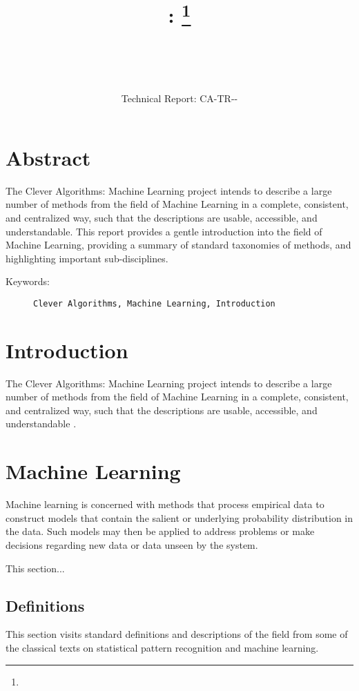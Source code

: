 \documentclass[a4paper, 11pt]{article}
\title{{\myreporttitle}: {\myreportsubtitle}\footnote{\myreportlicense}}
\author{\myreportauthor\\{\myreportemail}\\\small\myreportproject}
\date{\myreportfulldate\\{\small{Technical Report: CA-TR-{\myreportdate}-\myreportversion}}}
\begin{document}
\maketitle

\section*{Abstract} 
The Clever Algorithms: Machine Learning project intends to describe a large number of methods from the field of Machine Learning in a complete, consistent, and centralized way, such that the descriptions are usable, accessible, and understandable.
This report provides a gentle introduction into the field of Machine Learning, providing a summary of standard taxonomies of methods, and highlighting important sub-disciplines. 

\begin{description}
	\item[Keywords:] {\small\texttt{Clever Algorithms, Machine Learning, Introduction}}
\end{description} 

\section{Introduction}
\label{sec:introduction}
The Clever Algorithms: Machine Learning project intends to describe a large number of methods from the field of Machine Learning in a complete, consistent, and centralized way, such that the descriptions are usable, accessible, and understandable \cite{Brownlee2011a}.


\section{Machine Learning}
\label{sec:machine_learning}
Machine learning is concerned with methods that process empirical data to construct models that contain the salient or underlying probability distribution in the data. Such models may then be applied to address problems or make decisions regarding new data or data unseen by the system.

This section... 

\subsection{Definitions}
\label{subsec:definitions}
This section visits standard definitions and descriptions of the field from some of the classical texts on statistical pattern recognition and machine learning. 
\end{document}
